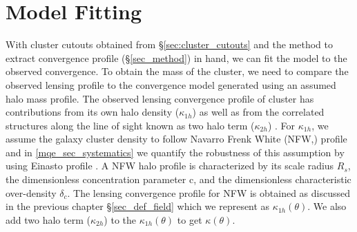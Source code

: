  \section{Model Fitting}
 \label{sec_model_fitting}
 With cluster cutouts obtained from \S\ref{sec:cluster_cutouts} and the method to extract convergence profile (\S\ref{sec_method}) in hand, we can fit the model to the observed convergence.
To obtain the mass of the cluster, we need to compare the observed lensing profile to the convergence model generated using an assumed halo mass profile.
 The observed lensing convergence profile of cluster has contributions from its own halo density ($\kappa_{1h}$) as well as from the correlated structures along the line of sight known as two halo term ($\kappa_{2h}$) \citep{oguri11}.
 For $\kappa_{1h}$, we assume the galaxy cluster density to follow Navarro Frenk White (NFW,\citep{navarro96}) profile and in \ref{mqe_sec_systematics} we quantify the robustness of this assumption by using Einasto profile \citep{einasto89}.
 A NFW halo profile is characterized by its scale radius $R_{s}$, the dimensionless concentration parameter c, and the dimensionless characteristic over-density $\delta_{c}$.
 The lensing convergence profile for NFW is obtained as discussed in the previous chapter \S\ref{sec_def_field} which we represent as $\kappa_{1h}(\theta)$. We also add two halo term ($\kappa_{2h}$) \citep{oguri11} to the  $\kappa_{1h}(\theta)$ to get $\kappa(\theta)$.
%
